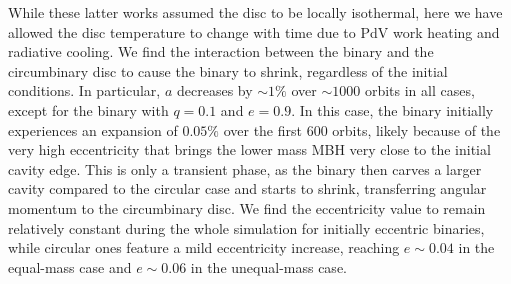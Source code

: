 \documentclass{aa}
\begin{document}
While these latter works \citep{Franchini2022, Zrake2021,DOrazio2021} assumed the disc to be locally isothermal, here we have allowed the disc temperature to change with time due to PdV work heating and radiative cooling. 
We find the interaction between the binary and the circumbinary disc to cause the binary to shrink, regardless of the initial conditions. 
In particular, $a$ decreases by $ \sim 1\%$ over $\sim 1000$ orbits in all cases, except for the binary with $q=0.1$ and $e=0.9$. In this case, the binary initially experiences an expansion of $0.05\%$ over the first 600 orbits, likely because of the very high eccentricity that brings the lower mass MBH very close to the initial cavity edge. This is only a transient phase, as the binary then carves a larger cavity compared to the circular case and starts to shrink, transferring angular momentum to the circumbinary disc.
We find the eccentricity value to remain relatively constant during the whole simulation for initially eccentric binaries, while circular ones feature a mild eccentricity increase, reaching $e \sim 0.04$ in the equal-mass case and $e \sim 0.06$ in the unequal-mass case.
\end{document}
